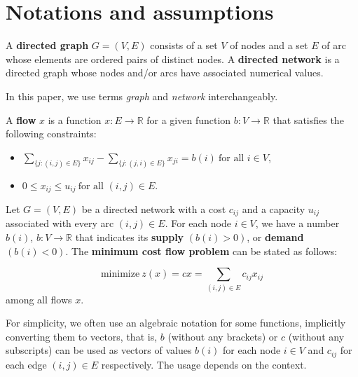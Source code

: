 \section{Notations and assumptions}

\begin{defn}
A \textbf{directed graph} $G=(V,E)$ consists of a set $V$ of nodes and a set $E$ of arc whose elements are ordered pairs of distinct nodes. A \textbf{directed network} is a directed graph whose nodes and/or arcs have associated numerical values. 
\end{defn}
In this paper, we use terms \textit{graph} and \textit{network} interchangeably. 

\begin{defn}
\label{def:flow}
    A \textbf{flow} $x$ is a function $x\colon E \rightarrow \mathbb{R}$ for a given function $b\colon V \to \mathbb{R}$ that satisfies the following constraints:
    \begin{itemize}
        \item $\sum _ {\{j\colon (i,j) \in E\}} x_{ij} - \sum _ {\{j\colon (j,i) \in E\}} x_{ji} = b(i)\ \text{for all } i\in V$,
        \item $0 \leq x_{ij} \leq u_{ij} \ \text{for all }(i,j) \in E$.
    \end{itemize}
\end{defn}


\begin{defn}
\label{def:mincostflow}
Let $G=(V,E)$ be a directed network with a cost $c_{ij}$ and a capacity $u_{ij}$ associated with every arc $(i,j) \in E$. For each node $i \in V$, we have a number $b(i)$, $b\colon V \to \mathbb{R}$ that indicates its \textbf{supply} $(b(i) > 0)$, or \textbf{demand} $(b(i) < 0)$. The \textbf{minimum cost flow problem} can be stated as follows:

\[
    \text{minimize}\ z(x) = cx = \sum_{(i,j) \in E} c_{ij} x_{ij}
\]    
among all flows $x$.

\end{defn}

For simplicity, we often use an algebraic notation for some functions, implicitly converting them to vectors, that is, $b$ (without any brackets) or $c$ (without any subscripts) can be used as vectors of values $b(i)$ for each node $i \in V$ and $c_{ij}$ for each edge $(i,j) \in E$ respectively. The usage depends on the context.


